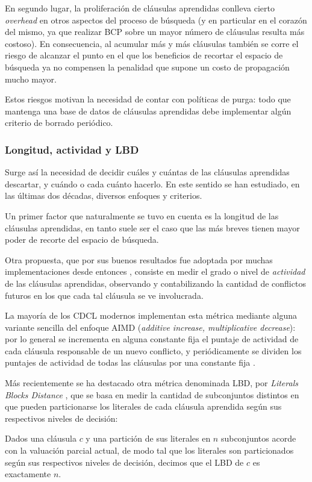 En segundo lugar, la proliferación de cláusulas aprendidas conlleva cierto \emph{overhead} en otros aspectos del proceso de búsqueda (y en particular en el corazón del mismo, ya que realizar BCP sobre un mayor número de cláusulas resulta más costoso). En consecuencia, al acumular más y más cláusulas también se corre el riesgo de alcanzar el punto en el que los beneficios de recortar el espacio de búsqueda ya no compensen la penalidad que supone un costo de propagación mucho mayor.

Estos riesgos motivan la necesidad de contar con políticas de purga: todo \ssolver que mantenga una base de datos de cláusulas aprendidas debe implementar algún criterio de borrado periódico.



\subsubsection{Longitud, actividad y LBD}

Surge así la necesidad de decidir cuáles y cuántas de las cláusulas aprendidas descartar, y cuándo o cada cuánto hacerlo. En este sentido se han estudiado, en las últimas dos décadas, diversos enfoques y criterios.

Un primer factor que naturalmente se tuvo en cuenta es la longitud de las cláusulas aprendidas, en tanto suele ser el caso \cite{marques-silva:iccad96} que las más breves tienen mayor poder de recorte del espacio de búsqueda.

Otra propuesta, que por sus buenos resultados fue adoptada por muchas implementaciones desde entonces \cite{goldberg:date02}, consiste en medir el grado o nivel de \emph{actividad} de las cláusulas aprendidas, observando y contabilizando la cantidad de conflictos futuros en los que cada tal cláusula se ve involucrada.

La mayoría de los \ssolvers CDCL modernos implementan esta métrica mediante alguna variante sencilla del enfoque AIMD (\emph{additive increase, multiplicative decrease}): por lo general se incrementa en alguna constante fija el puntaje de actividad de cada cláusula responsable de un nuevo conflicto, y periódicamente se dividen los puntajes de actividad de todas las cláusulas por una constante fija \cite{minisat??}.

Más recientemente se ha destacado otra métrica denominada LBD, por \emph{Literals Blocks Distance} \cite{Audemard:2009:PLC:1661445.1661509}, que se basa en medir la cantidad de subconjuntos distintos en que pueden particionarse los literales de cada cláusula aprendida según sus respectivos niveles de decisión:

\begin{definition}
Dados una cláusula $c$ y una partición de sus literales en $n$ subconjuntos acorde con la valuación parcial actual, de modo tal que los literales son particionados según sus respectivos niveles de decisión, decimos que el LBD de $c$ es exactamente $n$.
\end{definition}




